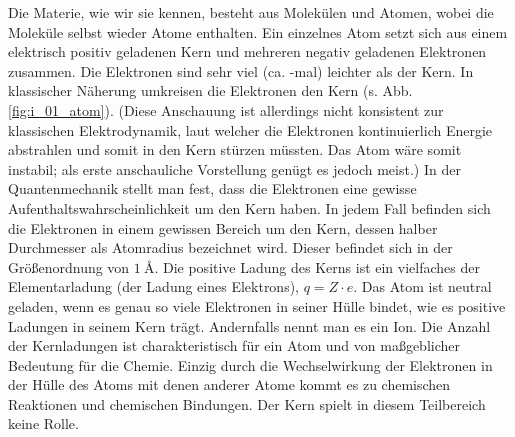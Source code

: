 \begin{figure}[bt]
\end{figure}

Die Materie, wie wir sie kennen, besteht aus Molekülen und Atomen, wobei die Moleküle selbst wieder Atome enthalten. Ein einzelnes Atom setzt sich aus einem elektrisch positiv geladenen Kern und mehreren negativ geladenen Elektronen zusammen. Die Elektronen sind sehr viel (ca. -mal) leichter als der Kern. In klassischer Näherung umkreisen die Elektronen den Kern (s. Abb. \ref{fig:i_01_atom}). (Diese Anschauung ist allerdings nicht konsistent zur klassischen Elektrodynamik, laut welcher die Elektronen kontinuierlich Energie abstrahlen und somit in den Kern stürzen müssten. Das Atom wäre somit instabil; als erste anschauliche Vorstellung genügt es jedoch meist.) In der Quantenmechanik stellt man fest, dass die Elektronen eine gewisse Aufenthaltswahrscheinlichkeit um den Kern haben. In jedem Fall befinden sich die Elektronen in einem gewissen Bereich um den Kern, dessen halber Durchmesser als Atomradius bezeichnet wird. Dieser befindet sich in der Größenordnung von $\SI{1}{\angstrom}$. Die positive Ladung des Kerns ist ein vielfaches der Elementarladung (der Ladung eines Elektrons), $q = Z \cdot e$. Das Atom ist neutral geladen, wenn es genau so viele Elektronen in seiner Hülle bindet, wie es positive Ladungen in seinem Kern trägt. Andernfalls nennt man es ein Ion. Die Anzahl der Kernladungen ist charakteristisch für ein Atom und von maßgeblicher Bedeutung für die Chemie. Einzig durch die Wechselwirkung der Elektronen in der Hülle des Atoms mit denen anderer Atome kommt es zu chemischen Reaktionen und chemischen Bindungen. Der Kern spielt in diesem Teilbereich keine Rolle.\\
